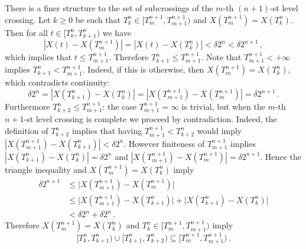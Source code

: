 \documentclass[a4paper]{article}
\begin{document}
There is a finer structure to the set of subcrossings of the $m$-th $(n+1)$-st level
crossing. Let $k\geq 0$ be such that $T_k^n \in [T_m^{n+1}, T_{m+1}^{n+1})$ and
$X(T_m^{n+1}) = X(T_k^n)$. Then for all $t \in [T_k^n, T_{k+1}^n)$ we have
\begin{equation*}
    |X(t) - X(T_m^{n+1})| = |X(t) - X(T_k^n)| < \delta 2^n < \delta 2^{n+1} \,,
\end{equation*}
which implies that $t \leq T_{m+1}^{n+1}$. Therefore $T_{k+1}^n \leq T_{m+1}^{n+1}$.
Note that $T_{m+1}^{n+1} < +\infty$ implies $T_{k+1}^n < T_{m+1}^{n+1}$. Indeed,
if this is otherwise, then $X(T_m^{n+1}) = X(T_k^n)$, which contradicts continuity:
\begin{equation*}
    \delta 2^n = |X(T_{k+1}^n) - X(T_k^n)|
    = |X(T_{m+1}^{n+1}) - X(T_m^{n+1})| = \delta 2^{n+1}\,.
\end{equation*}
Furthermore $T_{k+2}^n \leq T_{m+1}^{n+1}$: the case $T_{m+1}^{n+1} = \infty$ is trivial,
but when the $m$-th $n+1$-st level crossing is complete we proceed by contradiction.
Indeed, the definition of $T_{k+2}^n$ implies that having $T_{m+1}^{n+1} < T_{k+2}^n$
would imply $|X(T_{m+1}^{n+1}) - X(T_{k+1}^n)| < \delta 2^n$. However finiteness
of $T_{m+1}^{n+1}$ implies $|X(T_{k+1}^n) - X(T_k^n)| = \delta 2^n$ and
$|X(T_{m+1}^{n+1}) - X(T_m^{n+1})| = \delta 2^{n+1}$. Hence the triangle inequality
and $X(T_m^{n+1}) = X(T_k^n)$ imply
\begin{align*}
    \delta 2^{n+1}
    &\leq \bigl|X(T_{m+1}^{n+1}) - X(T_m^{n+1})\bigr| \\
    &\leq \bigl|X(T_{m+1}^{n+1}) - X(T_{k+1}^n)\bigr|
       + \bigl|X(T_{k+1}^n) - X(T_k^n)\bigr| \\
    &< \delta 2^n + \delta 2^n \,.
\end{align*}
Therefore $X(T_m^{n+1}) = X(T_k^n)$ and $T_k^n \in [T_m^{n+1}, T_{m+1}^{n+1})$ imply
\begin{equation} \label{eq:duration_partition}
    \bigl[T_k^n, T_{k+1}^n\bigr) \cup \bigl[T_{k+1}^n, T_{k+2}^n\bigr)
        \subseteq \bigl[T_m^{n+1}, T_{m+1}^{n+1}\bigr)
    \,.
\end{equation}
\end{document}
